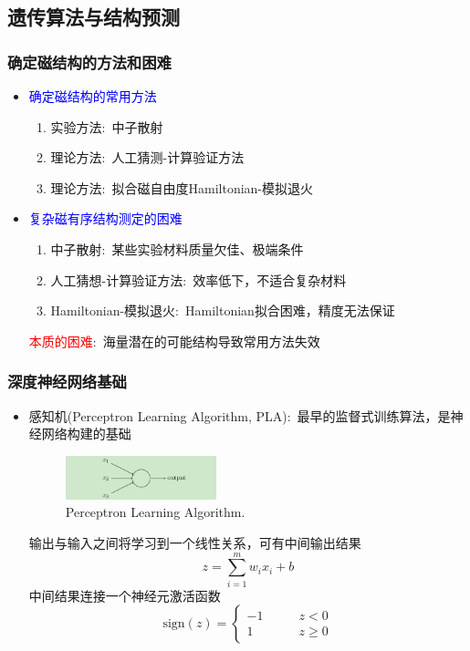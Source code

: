 \documentclass[cjk,slidestop,compress,mathserif,blue]{beamer}
\begin{document}
\subsection{遗传算法与结构预测}
\frame
{
	\frametitle{确定磁结构的方法和困难}
	\begin{itemize}
                \setlength{\itemsep}{5pt}
		\item \textcolor{blue}{确定磁结构的常用方法}
			\begin{enumerate}
                                \setlength{\itemsep}{3pt}
				\item 实验方法:~中子散射
				\item 理论方法:~人工猜测-计算验证方法
				\item 理论方法:~拟合磁自由度\textrm{Hamiltonian}-模拟退火
			\end{enumerate}
		\item \textcolor{blue}{复杂磁有序结构测定的困难}
			\begin{enumerate}
                                \setlength{\itemsep}{3pt}
				\item 中子散射:~某些实验材料质量欠佳、极端条件
				\item 人工猜想-计算验证方法:~效率低下，不适合复杂材料
				\item \textrm{Hamiltonian}-模拟退火:~\textrm{Hamiltonian}拟合困难，精度无法保证
			\end{enumerate}
			\textcolor{red}{本质的困难}:~海量潜在的可能结构导致常用方法失效
	\end{itemize}
}

\frame
{
	\frametitle{深度神经网络基础}
	\begin{itemize}
		\item 感知机(\textrm{Perceptron Learning Algorithm, PLA}):~最早的监督式训练算法，是神经网络构建的基础
\begin{figure}[h!]
\vspace*{-0.08in}
\centering
\includegraphics[height=0.50in]{Figures/DNN_PLA.png}
\caption{\tiny \textrm{Perceptron Learning Algorithm.}}%
\label{Fig:PLA}
\end{figure}
输出与输入之间将学习到一个线性关系，可有中间输出结果
\begin{displaymath}
	z=\sum_{i=1}^mw_ix_i+b
\end{displaymath}
中间结果连接一个神经元激活函数
\begin{displaymath}
	\mathrm{sign}(z)=\left\{
		\begin{aligned}
			-1\qquad &z<0\\
			1 \qquad &z\geqslant 0
		\end{aligned}\right.
\end{displaymath}
	\end{itemize}
}
\end{document}
